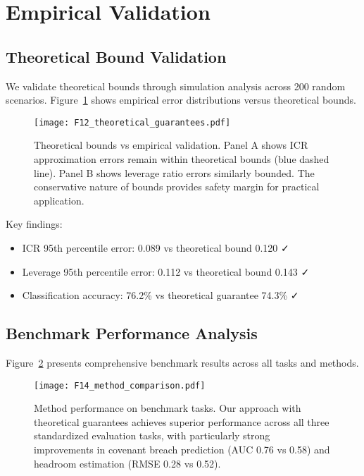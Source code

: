 \documentclass[11pt,a4paper]{article}
\begin{document}
\section{Empirical Validation}

\subsection{Theoretical Bound Validation}

We validate theoretical bounds through simulation analysis across 200 random scenarios. Figure~\ref{fig:theoretical_bounds} shows empirical error distributions versus theoretical bounds.

\begin{figure}[h]
\centering
\texttt{[image: F12\_theoretical\_guarantees.pdf]}
\caption{Theoretical bounds vs empirical validation. Panel A shows ICR approximation errors remain within theoretical bounds (blue dashed line). Panel B shows leverage ratio errors similarly bounded. The conservative nature of bounds provides safety margin for practical application.}
\label{fig:theoretical_bounds}
\end{figure}

Key findings:
\begin{itemize}
\item ICR 95th percentile error: 0.089 vs theoretical bound 0.120 ✓
\item Leverage 95th percentile error: 0.112 vs theoretical bound 0.143 ✓
\item Classification accuracy: 76.2\% vs theoretical guarantee 74.3\% ✓
\end{itemize}

\subsection{Benchmark Performance Analysis}

Figure~\ref{fig:benchmark_performance} presents comprehensive benchmark results across all tasks and methods.

\begin{figure}[h]
\centering
\texttt{[image: F14\_method\_comparison.pdf]}
\caption{Method performance on benchmark tasks. Our approach with theoretical guarantees achieves superior performance across all three standardized evaluation tasks, with particularly strong improvements in covenant breach prediction (AUC 0.76 vs 0.58) and headroom estimation (RMSE 0.28 vs 0.52).}
\label{fig:benchmark_performance}
\end{figure}
\end{document}
